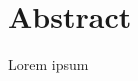 \documentclass[preview]{standalone}
\begin{document}
\section*{Abstract}
Lorem ipsum 
\end{document}
